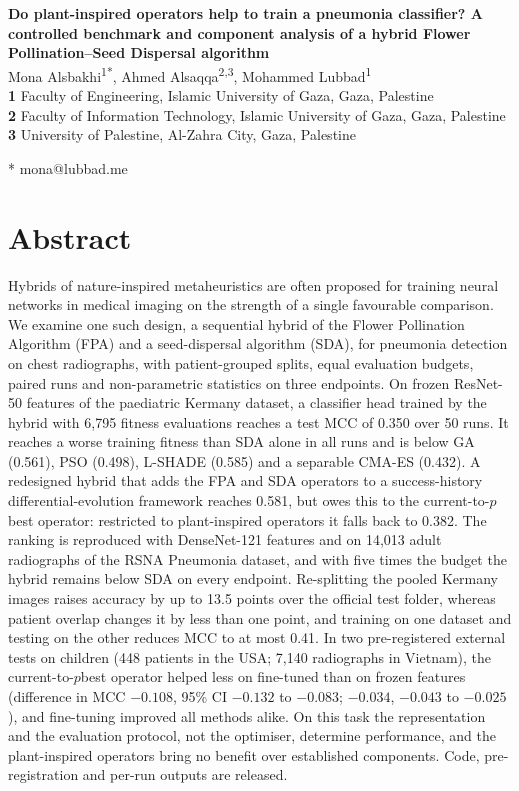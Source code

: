 \documentclass[10pt,letterpaper]{article}
\begin{document}
\vspace*{0.2in}
\begin{flushleft}
{\Large\textbf{Do plant-inspired operators help to train a pneumonia classifier? A controlled benchmark and component analysis of a hybrid Flower Pollination--Seed Dispersal algorithm}}
\newline
\\
Mona Alsbakhi\textsuperscript{1*},
Ahmed Alsaqqa\textsuperscript{2,3},
Mohammed Lubbad\textsuperscript{1}
\\
\bigskip
\textbf{1} Faculty of Engineering, Islamic University of Gaza, Gaza, Palestine
\\
\textbf{2} Faculty of Information Technology, Islamic University of Gaza, Gaza, Palestine
\\
\textbf{3} University of Palestine, Al-Zahra City, Gaza, Palestine
\\
\bigskip

* mona@lubbad.me
\end{flushleft}

\section*{Abstract}
Hybrids of nature-inspired metaheuristics are often proposed for training neural networks in medical imaging on the strength of a single favourable comparison. We examine one such design, a sequential hybrid of the Flower Pollination Algorithm (FPA) and a seed-dispersal algorithm (SDA), for pneumonia detection on chest radiographs, with patient-grouped splits, equal evaluation budgets, paired runs and non-parametric statistics on three endpoints. On frozen ResNet-50 features of the paediatric Kermany dataset, a classifier head trained by the hybrid with 6,795 fitness evaluations reaches a test MCC of 0.350 over 50 runs. It reaches a worse training fitness than SDA alone in all runs and is below GA (0.561), PSO (0.498), L-SHADE (0.585) and a separable CMA-ES (0.432). A redesigned hybrid that adds the FPA and SDA operators to a success-history differential-evolution framework reaches 0.581, but owes this to the current-to-$p$best operator: restricted to plant-inspired operators it falls back to 0.382. The ranking is reproduced with DenseNet-121 features and on 14,013 adult radiographs of the RSNA Pneumonia dataset, and with five times the budget the hybrid remains below SDA on every endpoint. Re-splitting the pooled Kermany images raises accuracy by up to 13.5 points over the official test folder, whereas patient overlap changes it by less than one point, and training on one dataset and testing on the other reduces MCC to at most 0.41. In two pre-registered external tests on children (448 patients in the USA; 7,140 radiographs in Vietnam), the current-to-$p$best operator helped less on fine-tuned than on frozen features (difference in MCC $-0.108$, 95\% CI $-0.132$ to $-0.083$; $-0.034$, $-0.043$ to $-0.025$), and fine-tuning improved all methods alike. On this task the representation and the evaluation protocol, not the optimiser, determine performance, and the plant-inspired operators bring no benefit over established components. Code, pre-registration and per-run outputs are released.
\end{document}

